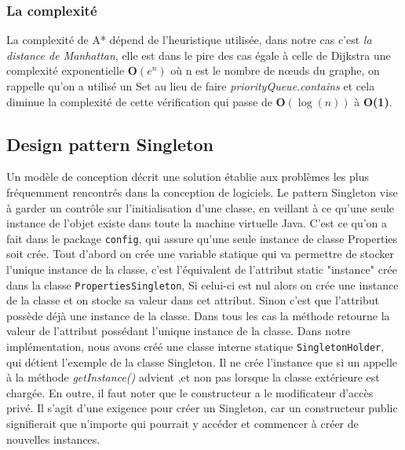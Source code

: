 \documentclass[12pt, a4paper, openany]{article}
\newcommand{\packagename}[1]{\texttt{#1}}
\newcommand{\classname}[1]{\texttt{#1}}
\newcommand{\methodename}[1]{\textit{#1}}
\begin{document}
\subsubsection{La complexité}
La complexité de A* dépend de l'heuristique utilisée, dans notre cas c'est \textit{la distance de Manhattan}, elle est dans le pire des cas égale à celle de Dijkstra une complexité exponentielle \textbf{{O}$(e^n)$} où n est le nombre de nœuds du graphe, on rappelle qu'on a utilisé un Set au lieu de faire \textit{priorityQueue.contains} et cela  diminue la complexité de cette vérification qui passe de \textbf{{O}$(\log(n))$} à \textbf{{O}(1)}.

\subsection{Design pattern Singleton}
Un modèle de conception décrit une solution établie aux problèmes les plus fréquemment rencontrés dans la conception de logiciels.
Le pattern Singleton vise à garder un contrôle sur l'initialisation d'une classe, en veillant à ce qu’une seule instance de l’objet existe dans toute la machine virtuelle Java.
C'est ce qu'on a fait dans le package \packagename{config}, qui assure qu'une seule instance de classe Properties soit crée.
Tout d'abord on crée une variable statique qui va permettre de stocker l'unique instance de la classe, c'est l'équivalent de l'attribut static "instance" crée dans la classe \classname{PropertiesSingleton}, Si celui-ci est nul alors on crée une instance de la classe et on stocke sa valeur dans cet attribut. Sinon c’est que l’attribut possède déjà une instance de la classe. Dans tous les cas la méthode retourne la valeur de l’attribut possédant l’unique instance de la classe.
Dans notre implémentation, nous avons créé une classe interne statique \classname{SingletonHolder}, qui détient l’exemple de la classe Singleton. Il ne crée l’instance que si un appelle à  la méthode \methodename{getInstance()} advient ,et non pas lorsque la classe extérieure est chargée.
En outre, il faut noter que le constructeur a le modificateur d’accès privé. Il s’agit d’une exigence pour créer un Singleton, car un constructeur public signifierait que n’importe qui pourrait y accéder et commencer à créer de nouvelles instances.
\end{document}
